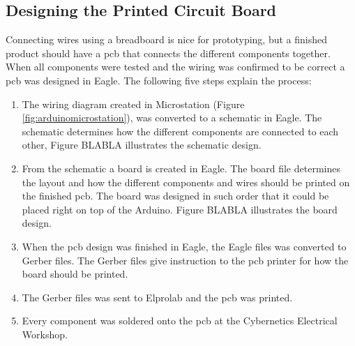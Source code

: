 \subsection{Designing the Printed Circuit Board}
Connecting wires using a breadboard is nice for prototyping, but a finished product should have a \acrshort{pcb} that connects the different components together. When all components were tested and the wiring was confirmed to be correct a \acrshort{pcb} was designed in Eagle. The following five steps explain the process:
\begin{enumerate}[1.]
\item The wiring diagram created in Microstation (Figure \ref{fig:arduinomicrostation}), was converted to a schematic in Eagle. The schematic determines how the different components are connected to each other, Figure BLABLA illustrates the schematic design. 
\item From the schematic a board is created in Eagle. The board file determines the layout and how the different components and wires should be printed on the finished \acrshort{pcb}. The board was designed in such order that it could be placed right on top of the Arduino. Figure BLABLA illustrates the board design. 
\item When the \acrshort{pcb} design was finished in Eagle, the Eagle files was converted to Gerber files. The Gerber files give instruction to the \acrshort{pcb} printer for how the board should be printed.
\item The Gerber files was sent to Elprolab and the \acrshort{pcb} was printed.
\item Every component was soldered onto the \acrshort{pcb} at the Cybernetics Electrical Workshop.
\end{enumerate}